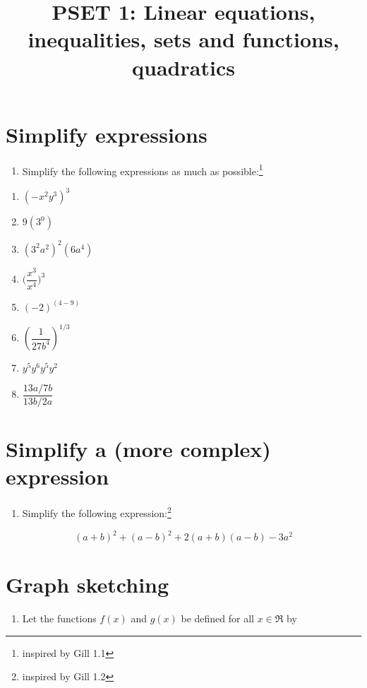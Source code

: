 \documentclass[
]{article}
\title{PSET 1: Linear equations, inequalities, sets and functions,
quadratics}
\author{}
\date{\vspace{-2.5em}}
\providecommand{\tightlist}{%
  \setlength{\itemsep}{0pt}\setlength{\parskip}{0pt}}
\begin{document}
\maketitle

\section{Simplify expressions}\label{simplify-expressions}

\begin{enumerate}
\def\labelenumi{\arabic{enumi}.}
\tightlist
\item
  Simplify the following expressions as much as possible:\footnote{inspired
    by Gill 1.1}
\end{enumerate}

\begin{enumerate}
\def\labelenumi{\alph{enumi}.}
\item
  \((-x^2y^3)^3\)
\item
  \(9(3^0)\)
\item
  \((3^2a^2)^2(6a^4)\)
\item
  \(\Big(\dfrac{x^3}{x^4}\Big)^3\)
\item
  \((-2)^{(4-9)}\)
\item
  \(\left(\dfrac{1}{27b^4}\right)^{1/3}\)
\item
  \(y^5y^6y^5y^2\)
\item
  \(\dfrac{13a/7b}{13b/2a}\)
\end{enumerate}

\section{Simplify a (more complex)
expression}\label{simplify-a-more-complex-expression}

\begin{enumerate}
\def\labelenumi{\arabic{enumi}.}
\setcounter{enumi}{1}
\tightlist
\item
  Simplify the following expression:\footnote{inspired by Gill 1.2}
\end{enumerate}

\[(a+b)^2 + (a-b)^2 + 2(a+b)(a-b) - 3a^2\]

\section{Graph sketching}\label{graph-sketching}

\begin{enumerate}
\def\labelenumi{\arabic{enumi}.}
\setcounter{enumi}{2}
\tightlist
\item
  Let the functions \(f(x)\) and \(g(x)\) be defined for all
  \(x \in \Re\) by
\end{enumerate}
\end{document}
